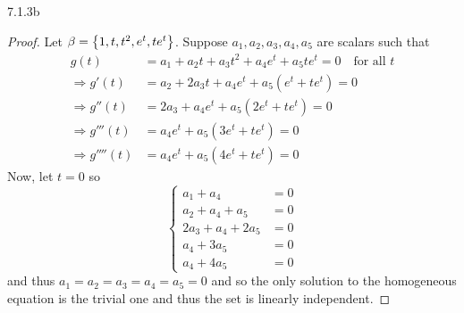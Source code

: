 \documentclass{exam}
\begin{document}
\begin{problem}{7.1.3b}
    \begin{proof}
      Let $\beta = \left\{1, t, t^2, e^t, te^t \right\}$. Suppose $a_1, a_2, a_3, a_4, a_5$ are scalars such that 
      \begin{align*}
        g(t) &= a_1 + a_2 t + a_3 t^2 + a_4 e^{t} + a_5 te^{t} = 0 \quad \text{for all } t \\
        \Rightarrow g'(t) &= a_2 + 2a_3 t + a_4 e^t + a_5(e^t + te^t) = 0\\
        \Rightarrow g''(t) &= 2a_3 + a_4 e^t + a_5(2e^t + te^t) = 0 \\
        \Rightarrow g'''(t) &= a_4 e^t + a_5(3e^t + te^t) = 0 \\
        \Rightarrow g''''(t) &= a_4 e^t + a_5(4e^t + te^t) = 0
      \end{align*}
      Now, let $t = 0$ so 
      \[
        \begin{cases}
          a_1 + a_4 &= 0 \\
          a_2 + a_4 + a_5 &= 0 \\
          2a_3 + a_4 + 2a_5 &= 0 \\
          a_4 + 3a_5 &= 0 \\
          a_4 + 4a_5 &= 0 
        \end{cases}
      \]
      and thus $a_1 = a_2 = a_3 = a_4 = a_5 = 0$ and so the only solution to the homogeneous equation is the trivial one and thus the set is linearly independent.
    \end{proof}
  \end{problem}
\end{document}
